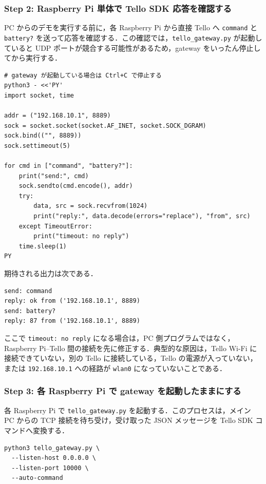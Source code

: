 \subsubsection{Step 2: Raspberry Pi 単体で Tello SDK 応答を確認する}

PC からのデモを実行する前に，各 Raspberry Pi から直接 Tello へ \texttt{command} と \texttt{battery?} を送って応答を確認する．この確認では，\texttt{tello\_gateway.py} が起動していると UDP ポートが競合する可能性があるため，gateway をいったん停止してから実行する．

\begin{lstlisting}
# gateway が起動している場合は Ctrl+C で停止する
python3 - <<'PY'
import socket, time

addr = ("192.168.10.1", 8889)
sock = socket.socket(socket.AF_INET, socket.SOCK_DGRAM)
sock.bind(("", 8889))
sock.settimeout(5)

for cmd in ["command", "battery?"]:
    print("send:", cmd)
    sock.sendto(cmd.encode(), addr)
    try:
        data, src = sock.recvfrom(1024)
        print("reply:", data.decode(errors="replace"), "from", src)
    except TimeoutError:
        print("timeout: no reply")
    time.sleep(1)
PY
\end{lstlisting}

期待される出力は次である．

\begin{lstlisting}
send: command
reply: ok from ('192.168.10.1', 8889)
send: battery?
reply: 87 from ('192.168.10.1', 8889)
\end{lstlisting}

ここで \texttt{timeout: no reply} になる場合は，PC 側プログラムではなく，Raspberry Pi--Tello 間の接続を先に修正する．典型的な原因は，Tello Wi-Fi に接続できていない，別の Tello に接続している，Tello の電源が入っていない，または \texttt{192.168.10.1} への経路が \texttt{wlan0} になっていないことである．

\subsubsection{Step 3: 各 Raspberry Pi で gateway を起動したままにする}

各 Raspberry Pi で \texttt{tello\_gateway.py} を起動する．このプロセスは，メイン PC からの TCP 接続を待ち受け，受け取った JSON メッセージを Tello SDK コマンドへ変換する．

\begin{lstlisting}
python3 tello_gateway.py \
  --listen-host 0.0.0.0 \
  --listen-port 10000 \
  --auto-command
\end{lstlisting}


